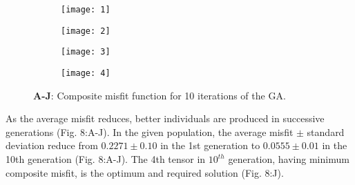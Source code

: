 \begin{figure}[h!]
\begin{subfigure}{\textwidth}
    \centering
    \texttt{[image: 1]}
\end{subfigure}
\end{figure}
\pagebreak
\begin{figure}[h!]
\ContinuedFloat
\begin{subfigure}{\textwidth}
    \centering
    \texttt{[image: 2]}
\end{subfigure}
\end{figure}
\pagebreak
\begin{figure}[h!]
\ContinuedFloat
\begin{subfigure}{\textwidth}
    \centering
    \texttt{[image: 3]}
\end{subfigure}
\end{figure}
\pagebreak
\begin{figure}[htb]
\ContinuedFloat
\begin{subfigure}{\textwidth}
    \centering
    \texttt{[image: 4]}
\end{subfigure}
\caption{\textbf{A-J}: Composite misfit function for 10 iterations of the GA.}
\end{figure}


As the average misfit reduces, better individuals are produced in successive generations (Fig. 8:A-J). In the given population, the average misfit $\pm$ standard deviation reduce from $0.2271 \pm 0.10$ in the 1st generation to $0.0555 \pm 0.01$ in the 10th generation (Fig. 8:A-J). The 4th tensor in $10^{th}$ generation, having minimum composite misfit, is the optimum and required solution (Fig. 8:J).